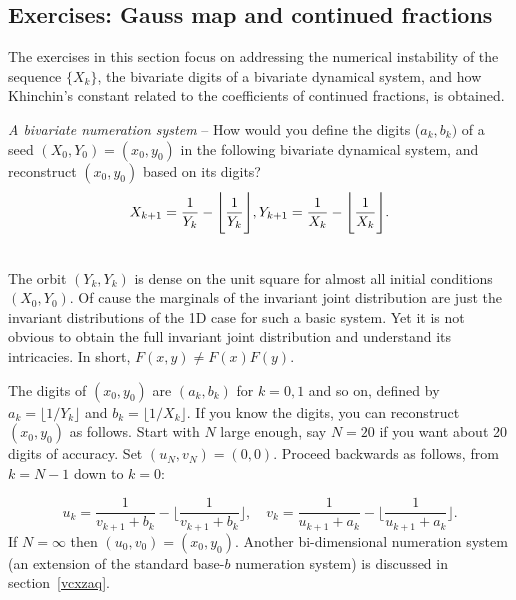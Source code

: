 \documentclass[oneside,10pt]{book}
\begin{document}
\subsection{Exercises: Gauss map and continued fractions}

The exercises in this section focus on addressing the numerical instability of the sequence $\{X_k\}$, the bivariate digits of a
 bivariate dynamical system, and how Khinchin's constant related to the coefficients of continued fractions, is obtained.

\begin{Exercise} {\em A bivariate numeration system} -- How would you define the digits ($a_k, b_k)$ of a seed $(X_0,Y_0)=(x_0,y_0)$ in the following bivariate dynamical system, and reconstruct $(x_0,y_0)$ based on its digits?
$$X_{k+1}=\frac{1}{Y_k}-\Bigg\lfloor\frac{1}{Y_k}\Bigg\rfloor,\\
Y_{k+1}=\frac{1}{X_k}-\Bigg\lfloor\frac{1}{X_k}\Bigg\rfloor.$$

 \\
The orbit $(Y_k,Y_k)$ is dense on the unit square for almost all initial conditions $(X_0,Y_0)$. Of cause  the marginals of the invariant joint distribution are just the invariant distributions of the 1D case for such a basic system. Yet it is not obvious to obtain the full invariant joint distribution and understand its intricacies. In short, $F(x,y)\neq F(x)F(y)$.

The digits of $(x_0,y_0)$ are $(a_k,b_k)$ for $k=0,1$ and so on, defined by $a_k=\lfloor 1/Y_k\rfloor$ and $b_k=\lfloor 1/X_k\rfloor$. If you know the digits, you can reconstruct $(x_0,y_0)$ as follows. Start with $N$ large enough, say $N=20$ if you want about 20 digits of accuracy. Set $(u_N,v_N)=(0,0)$. Proceed backwards as follows, from $k=N-1$ down to $k=0$:

$$u_k = \frac{1}{v_{k+1}+b_k} - \Big\lfloor \frac{1}{v_{k+1}+b_k} \Big\rfloor,\quad
v_k = \frac{1}{u_{k+1}+a_k} - \Big\lfloor \frac{1}{u_{k+1}+a_k} \Big\rfloor.
$$
If $N=\infty$ then $(u_0,v_0)=(x_0,y_0)$. Another bi-dimensional numeration system (an extension of the standard base-$b$ numeration system) is discussed in section~\ref{vcxzaq}.
\end{Exercise}
\end{document}
